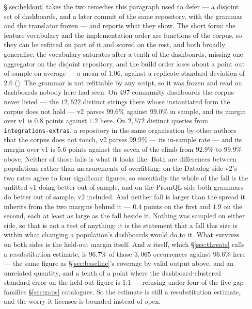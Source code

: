 \S\ref{sec:heldout} takes the two remedies this paragraph used to defer --- a disjoint
set of dashboards, and a later commit of the same repository, with the grammar and the
translator frozen --- and reports what they show. The short form: the feature vocabulary
and the implementation order are functions of the corpus, so they can be refitted on part
of it and scored on the rest, and both broadly generalise: the vocabulary saturates
after a tenth of the dashboards, missing one aggregator on the disjoint repository, and
the build order loses about a point out of sample on average --- a mean of $1.06$,
against a replicate standard deviation of $2.6$ (). The grammar
is not refittable by any script, so it was frozen and read on dashboards nobody here had
seen. On $497$ community dashboards the corpus never listed --- the $12{,}522$ distinct
strings there whose instantiated form the corpus does not hold --- v2 parses $99.6\%$
against $99.0\%$ in sample, and its margin over v1 is $0.8$ points against $1.2$ here. On
$2{,}572$ distinct queries from \texttt{integrations-extras}, a repository in the same
organisation by other authors that the corpus does not touch, v2 parses $99.9\%$ --- its
in-sample rate --- and its margin over v1 is $5.6$ points against the seven of the climb
from $92.9\%$ to $99.9\%$ above. Neither of those falls is what it looks like. Both are
differences between populations rather than measurements of overfitting: on the Datadog
side v2's two rates agree to four significant figures, so essentially the whole of the
fall is the unfitted v1 doing better out of sample, and on the PromQL side both grammars
do better out of sample, v2 included. And neither fall is larger than the spread it
inherits from the two margins behind it --- $0.4$ points on the first and $1.9$ on the
second, each at least as large as the fall beside it. Nothing was sampled on either
side, so that is not a test of anything; it is the statement that a fall this size is
within what changing a population's dashboards would do to it. What survives on both sides is the
held-out margin itself. And
$\kappa$ itself, which \S\ref{sec:threats} calls a resubstitution estimate, is
$96.7\%$ of those $3{,}065$ occurrences against $96.6\%$ here --- the same figure as
\S\ref{sec:baseline}'s coverage by valid output above, and an unrelated quantity, and a
tenth of a point where the dashboard-clustered standard error on the held-out
figure is $1.1$ --- refusing under
four of the five gap families \S\ref{sec:gaps} catalogues. So the estimate is still a
resubstitution estimate, and the worry it licenses is bounded instead of open.
